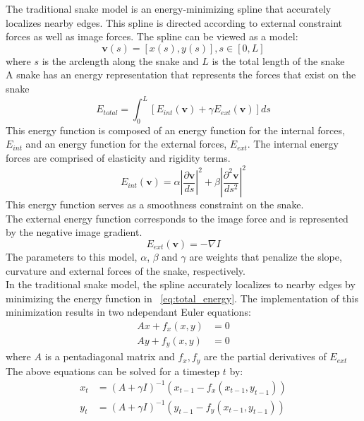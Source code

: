 \documentclass[twoside]{article}
\begin{document}
\begin{multicols}{2}
The traditional snake model is an energy-minimizing spline that accurately localizes nearby edges. This spline is directed according to external constraint forces as well as image forces. The
spline can be viewed as a model:\\
\begin{equation}
  \mathbf{v}(s) = [x(s), y(s)], s \in [0, L]
\end{equation}
where $s$ is the arclength along the snake and $L$ is the total length of the snake\\
A snake has an energy representation that represents the forces that exist on the snake\\
\begin{equation} \label{eq:total_energy}
  E_{total} = \int_{0}^{L} [E_{int}(\mathbf{v}) + \gamma E_{ext}(\mathbf{v})] ds
\end{equation}
This energy function is composed of an energy function for the internal forces, $E_{int}$ and an energy function for the external forces, $E_{ext}$. The internal energy forces are comprised of 
elasticity and rigidity terms.
\begin{equation}
  E_{int}(\mathbf{v}) = \alpha \left| \frac{\partial \mathbf{v}}{ds} \right|^{2} + \beta \left|\frac{\partial^{2}\mathbf{v}}{ds^{2}}\right|^{2}
\end{equation}
This energy function serves as a smoothness constraint on the snake. \\
The external energy function corresponds to the image force and is represented by the negative image gradient.
\begin{equation}
  E_{ext}(\mathbf{v}) = - \nabla I
\end{equation}
The parameters to this model, $\alpha$, $\beta$ and $\gamma$ are weights that penalize the slope, curvature and external forces of the snake, respectively. \\

In the traditional snake model, the spline accurately localizes to nearby edges by minimizing the energy function in ~\ref{eq:total_energy}. The implementation of this minimization
results in two ndependant Euler equations:
\begin{alignat}{2}
  Ax + f_{x}(x,y) &= 0 \\
  Ay + f_{y}(x,y) &= 0
\end{alignat}
where $A$ is a pentadiagonal matrix and $f_{x}, f_{y}$ are the partial derivatives of $E_{ext}$ \\

The above equations can be solved for a timestep $t$ by:
\begin{alignat}{2}
  x_{t} &= (A + \gamma I)^{-1}(x_{t-1} - f_{x}(x_{t-1},y_{t-1})) \\
  y_{t} &= (A + \gamma I)^{-1}(y_{t-1} - f_{y}(x_{t-1},y_{t-1}))
\end{alignat}


\end{multicols}
\end{document}
